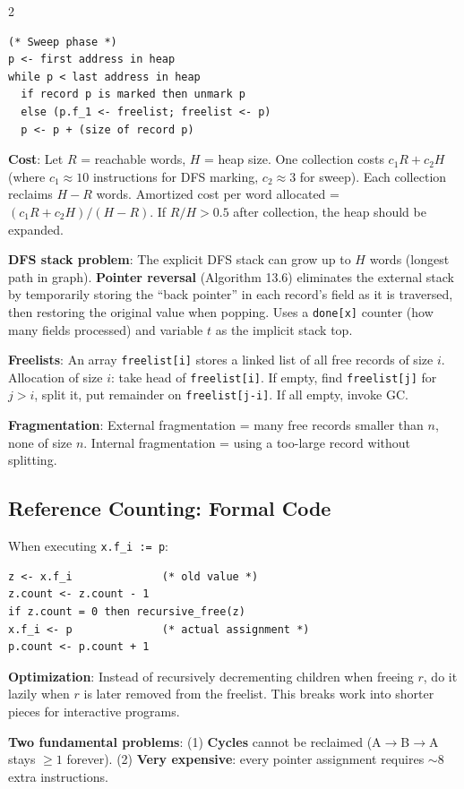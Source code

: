 \documentclass[9pt,landscape]{extarticle}
\begin{document}
\begin{multicols}{2}
\begin{lstlisting}
(* Sweep phase *)
p <- first address in heap
while p < last address in heap
  if record p is marked then unmark p
  else (p.f_1 <- freelist; freelist <- p)
  p <- p + (size of record p)
\end{lstlisting}

\textbf{Cost}: Let $R$ = reachable words, $H$ = heap size. One collection costs $c_1 R + c_2 H$ (where $c_1 \approx 10$ instructions for DFS marking, $c_2 \approx 3$ for sweep). Each collection reclaims $H - R$ words. Amortized cost per word allocated = $(c_1 R + c_2 H) / (H - R)$. If $R/H > 0.5$ after collection, the heap should be expanded.

\textbf{DFS stack problem}: The explicit DFS stack can grow up to $H$ words (longest path in graph). \textbf{Pointer reversal} (Algorithm 13.6) eliminates the external stack by temporarily storing the ``back pointer'' in each record's field as it is traversed, then restoring the original value when popping. Uses a \texttt{done[x]} counter (how many fields processed) and variable $t$ as the implicit stack top.

\textbf{Freelists}: An array \texttt{freelist[i]} stores a linked list of all free records of size $i$. Allocation of size $i$: take head of \texttt{freelist[i]}. If empty, find \texttt{freelist[j]} for $j > i$, split it, put remainder on \texttt{freelist[j-i]}. If all empty, invoke GC.

\textbf{Fragmentation}: External fragmentation = many free records smaller than $n$, none of size $n$. Internal fragmentation = using a too-large record without splitting.

\subsection{Reference Counting: Formal Code}

When executing \texttt{x.f\_i := p}:
\begin{lstlisting}
z <- x.f_i              (* old value *)
z.count <- z.count - 1
if z.count = 0 then recursive_free(z)
x.f_i <- p              (* actual assignment *)
p.count <- p.count + 1
\end{lstlisting}

\textbf{Optimization}: Instead of recursively decrementing children when freeing $r$, do it lazily when $r$ is later removed from the freelist. This breaks work into shorter pieces for interactive programs.

\textbf{Two fundamental problems}: (1) \textbf{Cycles} cannot be reclaimed (A$\to$B$\to$A stays $\geq 1$ forever). (2) \textbf{Very expensive}: every pointer assignment requires $\sim$8 extra instructions.


\end{multicols}
\end{document}
